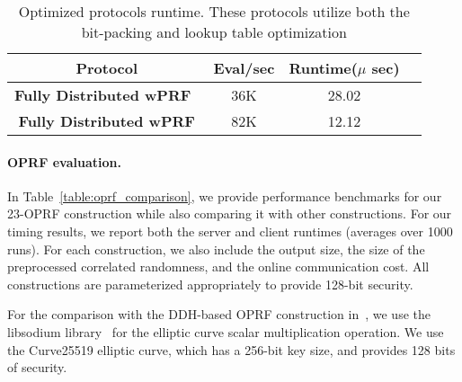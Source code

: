 \begin{table}[htbp]
	\begin{center}
		\begin{tabular}{|c|c|c|c|}
			\hline
			\textbf{Protocol} & \textbf{Eval/sec} & \textbf{Runtime($\mu$ sec)} \\
			\hline
			\hline
			\textbf{Fully Distributed wPRF~\cite{boneh2018-darkmatter}} & 36K & 28.02  \\
			\hline
			\textbf{Fully Distributed wPRF} &  82K &  12.12\\
			\hline
			
		\end{tabular}
		
		\vspace{-1mm}
		\caption{Optimized protocols runtime. These protocols utilize both the bit-packing and lookup table optimization}
		\label{RuntimeTable}
	\end{center}
	\vspace{-5mm}
\end{table}

\paragraph{OPRF evaluation.}
In Table~\ref{table:oprf_comparison}, we provide performance benchmarks for our 23-OPRF construction while also comparing it with other constructions. For our timing results, we report both the server and client runtimes (averages over 1000 runs). For each construction, we also include the output size, the size of the preprocessed correlated randomness, and the online communication cost. All constructions are parameterized appropriately to provide 128-bit security.

For the comparison with the DDH-based OPRF construction in~\cite{naor1999-oprf}, we use the libsodium library~\cite{LibSodium} for the elliptic curve scalar multiplication operation. We use the Curve25519 elliptic curve, which has a 256-bit key size, and provides 128 bits of security. 

